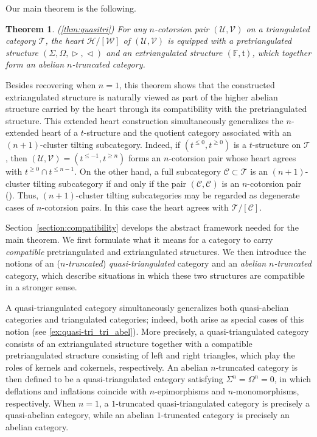 \documentclass[a4paper,reqno,10pt]{amsart}
\theoremstyle{definition}
\theoremstyle{definition}
\theoremstyle{definition}
\theoremstyle{definition}
\theoremstyle{plain}
\newtheorem{introthm}{Theorem}
\newcommand{\ft}{\mathfrak{t}}
\newcommand{\BF}{\mathbb{F}}
\newcommand{\CC}{\mathcal{C}}
\newcommand{\CH}{\mathcal{H}}
\newcommand{\CT}{\mathcal{T}}
\newcommand{\CU}{\mathcal{U}}
\newcommand{\CV}{\mathcal{V}}
\newcommand{\CW}{\mathcal{W}}
\begin{document}
Our main theorem is the following.
\begin{introthm}(\cref{thm:quasitri})
For any $n$-cotorsion pair $(\CU,\CV)$ on a triangulated category $\CT$, the heart $\CH/[\CW]$ of $(\CU,\CV)$ is equipped with a pretriangulated structure
$(\Sigma,\Omega,\vartriangleright,\vartriangleleft)$ and an extriangulated structure $(\BF,\ft)$, which together form an abelian $n$-truncated category.
\end{introthm}
Besides recovering \cite[Theorem~6.4]{Nak11} when $n=1$, this theorem shows that the constructed extriangulated structure is naturally viewed as part of the higher abelian structure carried by the heart through its compatibility with the pretriangulated structure.
This extended heart construction simultaneously generalizes the $n$-extended heart of a $t$-structure and the quotient category associated with an $(n+1)$-cluster tilting subcategory.
Indeed, if $(t^{\le0},t^{\ge0})$ is a $t$-structure on $\CT$, then $(\CU,\CV)=(t^{\le-1},t^{\ge n})$ forms an $n$-cotorsion pair whose heart agrees with $t^{\ge 0}\cap t^{\le n-1}$.
On the other hand, a full subcategory $\CC\subset\CT$ is an $(n+1)$-cluster tilting subcategory if and only if the pair
$(\CC,\CC)$ is an $n$-cotorsion pair (\cite[Theorem~3.1]{HZ22}).
Thus, $(n+1)$-cluster tilting subcategories may be regarded as degenerate cases of $n$-cotorsion pairs.
In this case the heart agrees with $\CT/[\CC]$.

Section~\ref{section:compatibility} develops the abstract framework needed for the main theorem.
We first formulate what it means for a category to carry \emph{compatible} pretriangulated and extriangulated structures.
We then introduce the notions of an (\emph{$n$-truncated}) \emph{quasi-triangulated} category and an \emph{abelian $n$-truncated} category, which describe situations in which these two structures are compatible in a stronger sense.

A quasi-triangulated category simultaneously generalizes both quasi-abelian categories and triangulated categories; indeed, both arise as special cases of this notion
(see \cref{ex:quasi-tri_tri_abel}). 
More precisely, a quasi-triangulated category consists of an extriangulated structure together with a compatible pretriangulated structure consisting of left and right triangles, which play the roles of kernels and cokernels, respectively.
An abelian $n$-truncated category is then defined to be a quasi-triangulated category satisfying $\Sigma^n=\Omega^n=0$, in which deflations and inflations coincide with $n$-epimorphisms and $n$-monomorphisms, respectively.
When $n=1$, a $1$-truncated quasi-triangulated category is precisely a quasi-abelian category, while an abelian $1$-truncated category is precisely
an abelian category.
\end{document}
